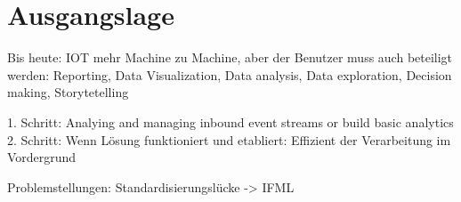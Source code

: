 
\chapter{Ausgangslage}

Bis heute: IOT mehr Machine zu Machine, aber der Benutzer muss auch beteiligt werden: Reporting, Data Visualization, Data analysis, Data exploration, Decision making, Storytetelling

1. Schritt: Analying and managing inbound event streams or build basic analytics
2. Schritt: Wenn Lösung funktioniert und etabliert: Effizient der Verarbeitung im Vordergrund

Problemstellungen: Standardisierungslücke -> IFML






